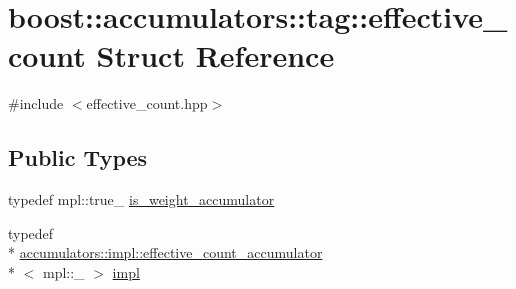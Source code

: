 \hypertarget{structboost_1_1accumulators_1_1tag_1_1effective__count}{\section{boost\-:\-:accumulators\-:\-:tag\-:\-:effective\-\_\-count Struct Reference}
\label{structboost_1_1accumulators_1_1tag_1_1effective__count}
}


{\ttfamily \#include $<$effective\-\_\-count.\-hpp$>$}

\subsection*{Public Types}
\begin{DoxyCompactItemize}
\item 
typedef mpl\-::true\-\_\- \hyperlink{structboost_1_1accumulators_1_1tag_1_1effective__count_ac4274fac6b1cf2217291494cd34d67d2}{is\-\_\-weight\-\_\-accumulator}
\item 
typedef \\*
\hyperlink{structboost_1_1accumulators_1_1impl_1_1effective__count__accumulator}{accumulators\-::impl\-::effective\-\_\-count\-\_\-accumulator}\\*
$<$ mpl\-::\-\_ $>$ \hyperlink{structboost_1_1accumulators_1_1tag_1_1effective__count_afb8cd525da641f5b3f81759f2c614350}{impl}
\end{DoxyCompactItemize}


